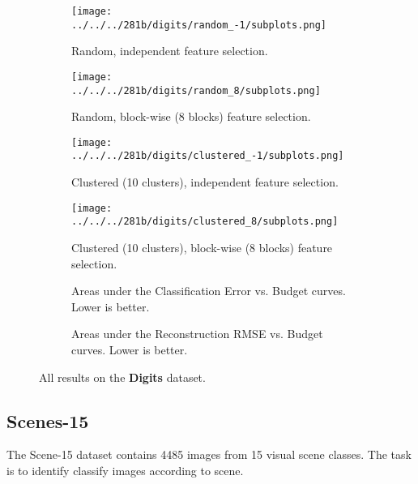 \begin{figure}[ht!]
    \centering    
    \begin{subfigure}[b]{\textwidth}
        \centering
        \texttt{[image: ../../../281b/digits/random\_-1/subplots.png]}
        \caption{Random, independent feature selection.\vspace{.2cm}}
    \end{subfigure}
    \begin{subfigure}[b]{\textwidth}
        \centering
        \texttt{[image: ../../../281b/digits/random\_8/subplots.png]}
        \caption{Random, block-wise (8 blocks) feature selection.\vspace{.2cm}}
    \end{subfigure}
    \begin{subfigure}[b]{\textwidth}
        \centering
        \texttt{[image: ../../../281b/digits/clustered\_-1/subplots.png]}
        \caption{Clustered (10 clusters), independent feature selection.\vspace{.2cm}}
    \end{subfigure}
    \begin{subfigure}[b]{\textwidth}
        \centering
        \texttt{[image: ../../../281b/digits/clustered\_8/subplots.png]}
        \caption{Clustered (10 clusters), block-wise (8 blocks) feature selection.\vspace{.2cm}}
    \end{subfigure}

    \small{
    \begin{subfigure}[b]{1\textwidth}
        \centering
        
        \caption{Areas under the Classification Error vs. Budget curves. Lower is better.}
    \end{subfigure}
    \begin{subfigure}[b]{1\textwidth}
        \centering
        
        \caption{Areas under the Reconstruction RMSE vs. Budget curves. Lower is better.}
    \end{subfigure}
    }

    \caption{All results on the \textbf{Digits} dataset.}
    \label{fig:digits}
\end{figure}


\subsection{Scenes-15}
The Scene-15 dataset \cite{Lazebnik-CVPR-2006} contains 4485 images from 15 visual scene classes.
The task is to identify classify images according to scene.

